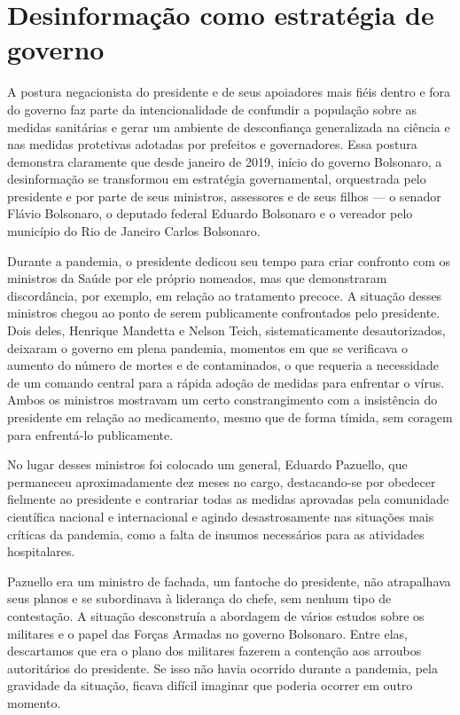 \section{Desinformação como estratégia de governo}

A postura negacionista do presidente e de seus apoiadores mais fiéis
dentro e fora do governo faz parte da intencionalidade de confundir a
população sobre as medidas sanitárias e gerar um ambiente de
desconfiança generalizada na ciência e nas medidas protetivas adotadas
por prefeitos e governadores. Essa postura demonstra claramente que
desde janeiro de 2019, início do governo Bolsonaro, a desinformação se
transformou em estratégia governamental, orquestrada pelo presidente e
por parte de seus ministros, assessores e de seus filhos --- o senador
Flávio Bolsonaro, o deputado federal Eduardo Bolsonaro e o vereador pelo
município do Rio de Janeiro Carlos Bolsonaro.

Durante a pandemia, o presidente dedicou seu tempo para criar confronto
com os ministros da Saúde por ele próprio nomeados, mas que demonstraram
discordância, por exemplo, em relação ao tratamento
precoce. A situação desses ministros chegou ao ponto de serem
publicamente confrontados pelo presidente. Dois deles, Henrique Mandetta
e Nelson Teich, sistematicamente desautorizados, deixaram o governo em
plena pandemia, momentos em que se verificava o aumento do número de
mortes e de contaminados, o que requeria a necessidade de um comando
central para a rápida adoção de medidas para enfrentar o vírus. Ambos os
ministros mostravam um certo constrangimento com a insistência do
presidente em relação ao medicamento, mesmo que de forma tímida, sem
coragem para enfrentá-lo publicamente.

No lugar desses ministros foi colocado um general, Eduardo Pazuello, que
permaneceu aproximadamente dez meses no cargo, destacando-se por
obedecer fielmente ao presidente e contrariar todas as medidas aprovadas
pela comunidade científica nacional e internacional e agindo
desastrosamente nas situações mais críticas da pandemia, como a falta de
insumos necessários para as atividades hospitalares.

Pazuello era um ministro de fachada, um fantoche do presidente, não
atrapalhava seus planos e se subordinava à liderança do chefe, sem
nenhum tipo de contestação. A situação desconstruía a abordagem de
vários estudos sobre os militares e o papel das Forças Armadas no
governo Bolsonaro. Entre elas, descartamos que era o plano dos militares
fazerem a contenção aos arroubos autoritários do presidente. Se isso não
havia ocorrido durante a pandemia, pela gravidade da situação, ficava
difícil imaginar que poderia ocorrer em outro momento.

